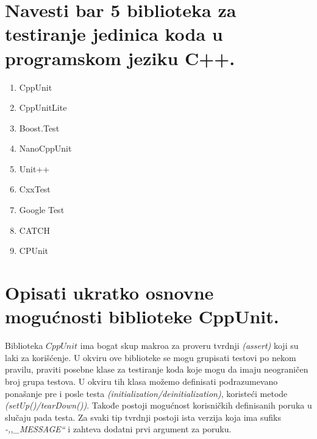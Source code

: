 \documentclass[a4paper]{article}
\begin{document}
\section{Navesti bar 5 biblioteka za testiranje jedinica koda u programskom jeziku C++.}
  \begin{enumerate}
    \item CppUnit
    \item CppUnitLite
    \item Boost.Test
    \item NanoCppUnit
    \item Unit++
    \item CxxTest
    \item Google Test
    \item CATCH
    \item CPUnit
  \end{enumerate}

\section{Opisati ukratko osnovne mogućnosti biblioteke CppUnit.}
  Biblioteka $CppUnit$ ima bogat skup makroa za proveru tvrdnji \textit{(assert)} koji su laki za korišćenje.
  U okviru ove biblioteke se mogu grupisati testovi po nekom pravilu, praviti posebne klase
  za testiranje koda koje mogu da imaju neograničen broj grupa testova. U okviru tih klasa
  možemo definisati podrazumevano ponašanje pre i posle testa \textit{(initialization/deinitialization)},
  koristeći metode \textit{(setUp()/tearDown())}.
  Takođe postoji mogućnost korisničkih definisanih poruka u slučaju pada testa. Za svaki tip tvrdnji
  postoji ista verzija koja ima sufiks \textit{-,,\_MESSAGE``} i zahteva dodatni prvi argument za poruku. 
\end{document}
